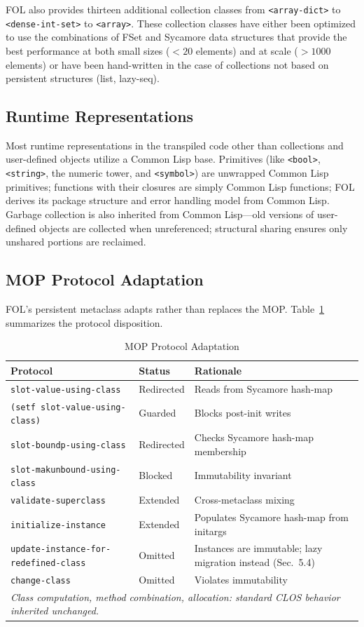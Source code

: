 \documentclass[sigconf,nonacm,review]{acmart}
\begin{document}
FOL also provides thirteen additional collection classes from \texttt{<array-dict>} to \texttt{<dense-int-set>} to \texttt{<array>}. These collection classes have either been optimized to use the
combinations of FSet and Sycamore data structures that provide the best performance at both small sizes ($< 20$ elements) and at scale ($> 1000$ elements) or have been hand-written in the case of
collections not based on persistent structures (list, lazy-seq).

\subsection{Runtime Representations}

Most runtime representations in the transpiled code other than collections and user-defined objects utilize a Common Lisp base. Primitives (like \texttt{<bool>}, \texttt{<string>}, the numeric
tower, and \texttt{<symbol>}) are unwrapped Common Lisp primitives; functions with their closures are simply Common Lisp functions; FOL derives its package structure and error handling model
from Common Lisp. Garbage collection is also inherited from Common Lisp---old versions of user-defined objects are collected when unreferenced; structural sharing ensures only unshared portions are reclaimed.

\subsection{MOP Protocol Adaptation}

FOL's persistent metaclass adapts rather than replaces the MOP. Table~\ref{tab:mop} summarizes the protocol disposition.

\begin{table}[htbp]
\caption{MOP Protocol Adaptation}
\label{tab:mop}
\begin{tabular}{lll}
\toprule
\textbf{Protocol} & \textbf{Status} & \textbf{Rationale} \\
\midrule
\texttt{slot-value-using-class} & Redirected & Reads from Sycamore hash-map \\
\texttt{(setf slot-value-using-class)} & Guarded & Blocks post-init writes \\
\texttt{slot-boundp-using-class} & Redirected & Checks Sycamore hash-map membership \\
\texttt{slot-makunbound-using-class} & Blocked & Immutability invariant \\
\texttt{validate-superclass} & Extended & Cross-metaclass mixing \\
\texttt{initialize-instance} & Extended & Populates Sycamore hash-map from initargs \\
\texttt{update-instance-for-redefined-class} & Omitted & Instances are immutable; lazy migration instead (Sec.~5.4) \\
\texttt{change-class} & Omitted & Violates immutability \\
\midrule
\multicolumn{3}{l}{\textit{Class computation, method combination, allocation: standard CLOS behavior inherited unchanged.}} \\
\bottomrule
\end{tabular}
\end{table}
\end{document}
